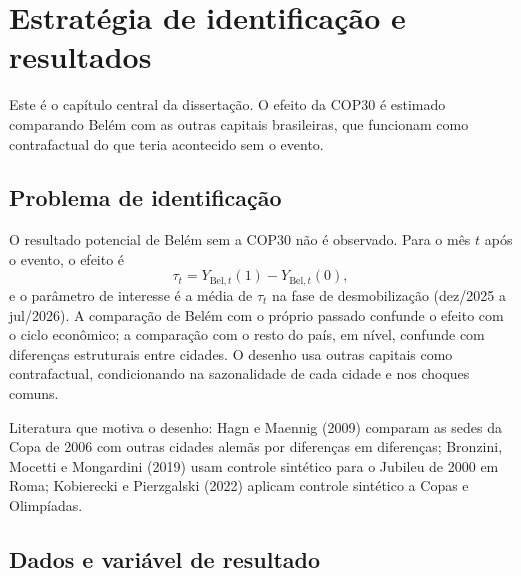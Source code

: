 \chapter{Estratégia de identificação e resultados}\label{cap:micro}

Este é o capítulo central da dissertação. O efeito da COP30 é estimado comparando Belém com as outras capitais brasileiras, que funcionam como contrafactual do que teria acontecido sem o evento.


\noindent{}

\section{Problema de identificação}

O resultado potencial de Belém sem a COP30 não é observado. Para o mês $t$ após o evento, o efeito é
\begin{equation}
\tau_t = Y_{\text{Bel},t}(1) - Y_{\text{Bel},t}(0),
\end{equation}
e o parâmetro de interesse é a média de $\tau_t$ na fase de desmobilização (dez/2025 a jul/2026).
A comparação de Belém com o próprio passado confunde o efeito com o ciclo econômico; a comparação
com o resto do país, em nível, confunde com diferenças estruturais entre cidades. O desenho usa outras
capitais como contrafactual, condicionando na sazonalidade de cada cidade e nos choques comuns.

Literatura que motiva o desenho: Hagn e Maennig (2009) comparam as sedes da Copa de 2006 com outras
cidades alemãs por diferenças em diferenças; Bronzini, Mocetti e Mongardini (2019) usam controle
sintético para o Jubileu de 2000 em Roma; Kobierecki e Pierzgalski (2022) aplicam controle sintético
a Copas e Olimpíadas.


\section{Dados e variável de resultado}

